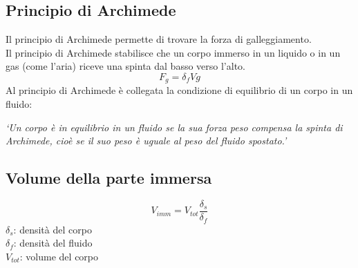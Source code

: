   \subsection{Principio di Archimede}
  Il principio di Archimede permette di trovare la forza di galleggiamento.\\
  Il principio di Archimede stabilisce che un corpo immerso in un liquido o in un gas (come l'aria) 
  riceve una spinta dal basso verso l'alto.
  \begin{equation*}
    F_g = \delta_fVg
  \end{equation*}
  Al principio di Archimede è collegata la condizione di equilibrio di un corpo in un fluido:\\
  \begin{center}
    \emph{`Un corpo è in equilibrio in un fluido se la sua forza peso compensa la spinta di 
    Archimede, cioè se il suo peso è uguale al peso del fluido spostato.'}
  \end{center}

  \subsection{Volume della parte immersa}
  \begin{equation*}
    V_{imm} = V_{tot}\frac{\delta_s}{\delta_f}
  \end{equation*}
  $\delta_s$: densità del corpo\\
  $\delta_f$: densità del fluido\\
  $V_{tot}$: volume del corpo

  \begin{center}
  \end{center}
